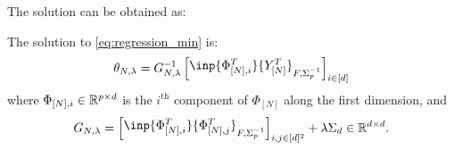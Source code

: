 \documentclass{article}
\begin{document}
The solution can be obtained as:

\begin{theorem} The solution to \eqref{eq:regression_min} is:
\begin{equation}
    \label{eq:vector_rls}
    \theta_{N,\lambda} = G_{N, \lambda}^{-1} \begin{bmatrix}\inp{\Phi_{[N],i}^T}{Y_{[N]}^T}_{F, \Sigma_p^{-1}}\end{bmatrix}_{i\in[d]}
\end{equation}
where $\Phi_{[N],i}\in\mathbb{R}^{p\times d}$ is the $i^\text{th}$ component of $\Phi_{[N]}$ along the first dimension, and
\begin{equation*}
    G_{N, \lambda} = \begin{bmatrix}\inp{\Phi_{[N],i}^T}{\Phi_{[N],j}^T}_{F, \Sigma_p^{-1}}\end{bmatrix}_{i,j\in[d]^2} + \lambda \Sigma_d \in \Real^{d\times d}.
\end{equation*}
\end{theorem}
\end{document}
